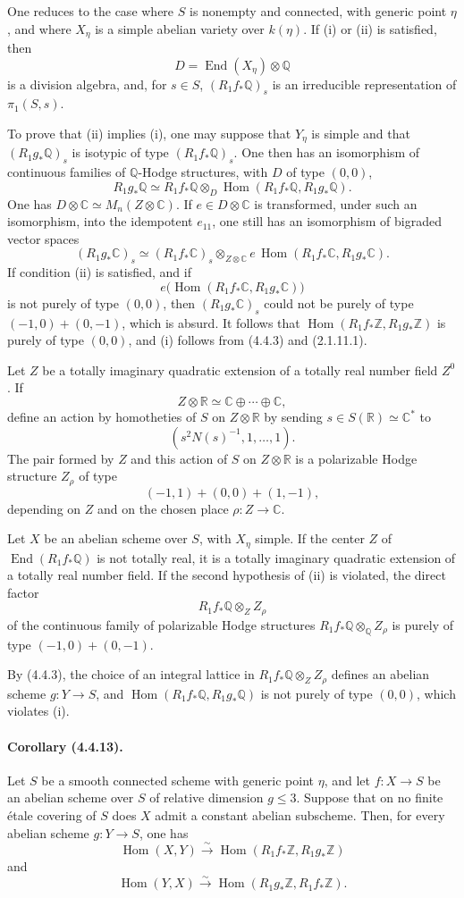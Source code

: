 \documentclass[10pt]{article}
\newcommand{\C}{\mathbb C}
\newcommand{\Q}{\mathbb Q}
\newcommand{\Z}{\mathbb Z}
\newcommand{\Hom}{\operatorname{Hom}}
\newcommand{\iso}{\xrightarrow{\sim}}
\newcommand{\R}{\mathbb R}
\providecommand{\End}{\operatorname{End}}
\begin{document}
One reduces to the case where $S$ is nonempty and connected, with generic point $\eta$, and where $X_\eta$ is a simple abelian variety over $k(\eta)$. If (i) or (ii) is satisfied, then
\[
D=\End(X_\eta)\otimes\Q
\]
is a division algebra, and, for $s\in S$, $(R_1f_*\Q)_s$ is an irreducible representation of $\pi_1(S,s)$.

To prove that (ii) implies (i), one may suppose that $Y_\eta$ is simple and that $(R_1g_*\Q)_s$ is isotypic of type $(R_1f_*\Q)_s$. One then has an isomorphism of continuous families of $\Q$-Hodge structures, with $D$ of type $(0,0)$,
\[
R_1g_*\Q\simeq R_1f_*\Q\otimes_D
\Hom(R_1f_*\Q,R_1g_*\Q).
\]
One has $D\otimes\C\simeq M_n(Z\otimes\C)$. If $e\in D\otimes\C$ is transformed, under such an isomorphism, into the idempotent $e_{11}$, one still has an isomorphism of bigraded vector spaces
\[
(R_1g_*\C)_s\simeq (R_1f_*\C)_s\otimes_{Z\otimes\C}
e\,\Hom(R_1f_*\C,R_1g_*\C).
\]
If condition (ii) is satisfied, and if
\[
e\bigl(\Hom(R_1f_*\C,R_1g_*\C)\bigr)
\]
is not purely of type $(0,0)$, then $(R_1g_*\C)_s$ could not be purely of type $(-1,0)+(0,-1)$, which is absurd. It follows that $\Hom(R_1f_*\Z,R_1g_*\Z)$ is purely of type $(0,0)$, and (i) follows from (4.4.3) and (2.1.11.1).

Let $Z$ be a totally imaginary quadratic extension of a totally real number field $Z^0$. If
\[
Z\otimes\R\simeq \C\oplus\cdots\oplus\C,
\]
define an action by homotheties of $S$ on $Z\otimes\R$ by sending $s\in S(\R)\simeq\C^*$ to
\[
(s^2N(s)^{-1},1,\ldots,1).
\]
The pair formed by $Z$ and this action of $S$ on $Z\otimes\R$ is a polarizable Hodge structure $Z_\rho$ of type
\[
(-1,1)+(0,0)+(1,-1),
\]
depending on $Z$ and on the chosen place $\rho:Z\to\C$.

Let $X$ be an abelian scheme over $S$, with $X_\eta$ simple. If the center $Z$ of $\End(R_1f_*\Q)$ is not totally real, it is a totally imaginary quadratic extension of a totally real number field. If the second hypothesis of (ii) is violated, the direct factor
\[
R_1f_*\Q\otimes_Z Z_\rho
\]
of the continuous family of polarizable Hodge structures $R_1f_*\Q\otimes_\Q Z_\rho$ is purely of type $(-1,0)+(0,-1)$.

By (4.4.3), the choice of an integral lattice in $R_1f_*\Q\otimes_ZZ_\rho$ defines an abelian scheme $g:Y\to S$, and $\Hom(R_1f_*\Q,R_1g_*\Q)$ is not purely of type $(0,0)$, which violates (i).

\paragraph{Corollary (4.4.13).} Let $S$ be a smooth connected scheme with generic point $\eta$, and let $f:X\to S$ be an abelian scheme over $S$ of relative dimension $g\le3$. Suppose that on no finite étale covering of $S$ does $X$ admit a constant abelian subscheme. Then, for every abelian scheme $g:Y\to S$, one has
\[
\Hom(X,Y)\iso \Hom(R_1f_*\Z,R_1g_*\Z)
\]
and
\[
\Hom(Y,X)\iso \Hom(R_1g_*\Z,R_1f_*\Z).
\]
\end{document}
